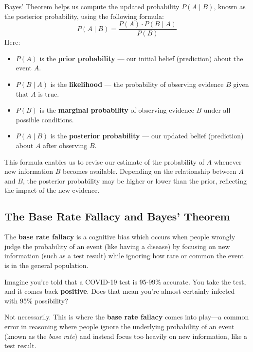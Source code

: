 \documentclass[twoside]{book}
\begin{document}
Bayes' Theorem helps us compute the updated probability \( P(A \mid B) \), known as the posterior probability, using the following formula:
\[
P(A \mid B) = \frac{P(A) \cdot P(B \mid A)}{P(B)}
\]
Here:
\begin{itemize}
    \item \( P(A) \) is the \textbf{prior probability} — our initial belief (prediction) about the event \( A \).
    \item \( P(B \mid A) \) is the \textbf{likelihood} — the probability of observing evidence \( B \) given that \( A \) is true.
    \item \( P(B) \) is the \textbf{marginal probability} of observing evidence \( B \) under all possible conditions.
    \item \( P(A \mid B) \) is the \textbf{posterior probability} — our updated belief (prediction)  about \( A \) after observing \( B \).
\end{itemize}

This formula enables us to revise our estimate of the probability of \( A \) whenever new information \( B \) becomes available. Depending on the relationship between \( A \) and \( B \), the posterior probability may be higher or lower than the prior, reflecting the impact of the new evidence.

\subsection{The Base Rate Fallacy and Bayes' Theorem}

\begin{textbox}
The \textbf{base rate fallacy} is a cognitive bias which occurs when people wrongly judge the probability of an event (like having a disease) by focusing on new information (such as a test result) while ignoring how rare or common the event is in the general population.
\end{textbox}

\medskip

Imagine you're told that a COVID-19 test is 95-99\% accurate. You take the test, and it comes back \textbf{positive}. Does that mean you're almost certainly infected with 95\% possibility?

Not necessarily. This is where the \textbf{base rate fallacy} comes into play—a common error in reasoning where people ignore the underlying probability of an event (known as the \textit{base rate}) and instead focus too heavily on new information, like a test result.
\end{document}
